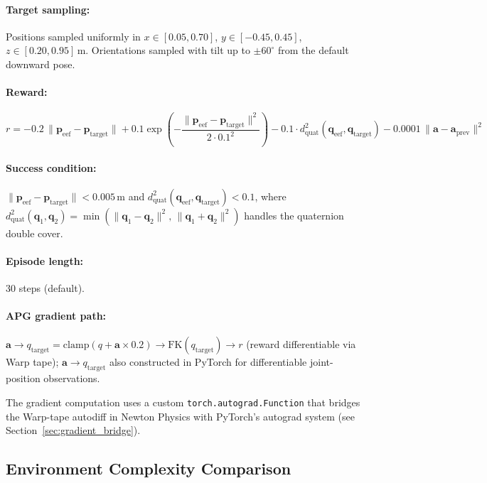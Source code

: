 \documentclass[11pt,a4paper]{article}
\newcommand{\bpf}{\mathbf{p}}
\newcommand{\ba}{\mathbf{a}}
\begin{document}
\paragraph{Target sampling:} Positions sampled uniformly in $x \in [0.05, 0.70]$, $y \in [-0.45, 0.45]$, $z \in [0.20, 0.95]$\,m. Orientations sampled with tilt up to $\pm 60^\circ$ from the default downward pose.

\paragraph{Reward:}
\begin{equation}
  r = -0.2\,\|\bpf_{\text{eef}} - \bpf_{\text{target}}\| + 0.1\exp\!\left(-\frac{\|\bpf_{\text{eef}} - \bpf_{\text{target}}\|^2}{2 \cdot 0.1^2}\right) - 0.1 \cdot d_{\text{quat}}^2(\mathbf{q}_{\text{eef}}, \mathbf{q}_{\text{target}}) - 0.0001\,\|\ba - \ba_{\text{prev}}\|^2
  \label{eq:fr_reward}
\end{equation}

\paragraph{Success condition:} $\|\bpf_{\text{eef}} - \bpf_{\text{target}}\| < 0.005$\,m and $d_{\text{quat}}^2(\mathbf{q}_{\text{eef}}, \mathbf{q}_{\text{target}}) < 0.1$, where $d_{\text{quat}}^2(\mathbf{q}_1, \mathbf{q}_2) = \min(\|\mathbf{q}_1 - \mathbf{q}_2\|^2,\,\|\mathbf{q}_1 + \mathbf{q}_2\|^2)$ handles the quaternion double cover.

\paragraph{Episode length:} 30 steps (default).

\paragraph{APG gradient path:} $\ba \rightarrow q_{\text{target}} = \text{clamp}(q + \ba \times 0.2) \rightarrow \text{FK}(q_{\text{target}}) \rightarrow r$ (reward differentiable via Warp tape); $\ba \rightarrow q_{\text{target}}$ also constructed in PyTorch for differentiable joint-position observations.

The gradient computation uses a custom \texttt{torch.autograd.Function} that bridges the Warp-tape autodiff in Newton Physics with PyTorch's autograd system (see Section~\ref{sec:gradient_bridge}).

\subsection{Environment Complexity Comparison}
\label{sec:env_comparison}
\end{document}
